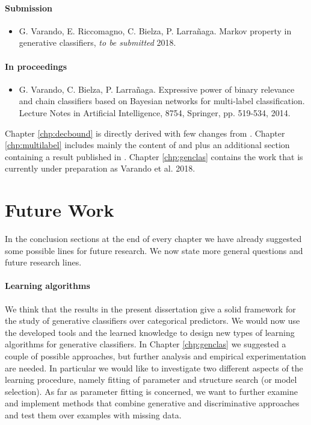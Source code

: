 \documentclass[11pt,a4paper, twoside]{book}
\begin{document}
\paragraph{Submission}
\begin{itemize}
\item G. Varando, E. Riccomagno, C. Bielza, P. Larrañaga. Markov property in generative classifiers, \textit{to be submitted} 2018.
\end{itemize}

\paragraph{In proceedings}
\begin{itemize}
\item G. Varando, C. Bielza, P. Larrañaga. Expressive power of binary relevance and chain classifiers based on Bayesian networks for multi-label classification. Lecture Notes in Artificial Intelligence, 8754, Springer, pp. 519-534, 2014. 
\end{itemize}


Chapter \ref{chp:decbound} is directly derived with few changes from \cite{varando15}. 
Chapter \ref{chp:multilabel} includes mainly the content of \cite{varando16} and \cite{varandopgm} plus an additional section containing a result published in \cite{WIDM:WIDM1157}. 
Chapter \ref{chp:genclas} contains the work that is currently under preparation as Varando et al. 2018.

\section{Future Work}

In the conclusion sections at the end of every chapter we have already suggested some possible lines for future research. We now state more general questions and future research lines.

\paragraph{Learning algorithms}

We think that the results in the present dissertation give a solid framework for the study of generative classifiers over categorical predictors. We would now use the developed tools and the learned knowledge to design new types of learning algorithms for generative classifiers. 
In Chapter \ref{chp:genclas} we suggested a couple of possible approaches, but further analysis and empirical experimentation are needed.  
In particular we would like to investigate two different aspects of the learning procedure, namely fitting of parameter and structure search (or model selection).
As far as parameter fitting is concerned, we want to further examine and implement methods that combine generative and discriminative approaches and test them over examples with missing data.
\end{document}
